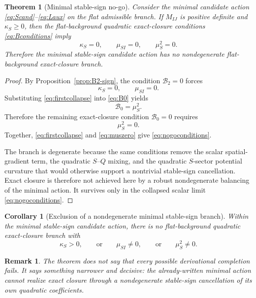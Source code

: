 \documentclass[11pt]{article}
\newtheorem{theorem}{Theorem}
\newtheorem{remark}{Remark}
\newtheorem{corollary}{Corollary}
\begin{document}
\begin{theorem}[Minimal stable-sign no-go]
\label{thm:minimal-no-go}
Consider the minimal candidate action \eqref{eq:Scand}--\eqref{eq:Laux} on the flat admissible branch. If \(\widehat M_{IJ}\) is positive definite and \(\kappa_S\ge 0\), then the flat-background quadratic exact-closure conditions \eqref{eq:Bconditions} imply
\begin{equation}
\kappa_S=0,
\qquad
\mu_{SI}=0,
\qquad
\mu_S^2=0.
\label{eq:nogoconditions}
\end{equation}
Therefore the minimal stable-sign candidate action has no nondegenerate flat-background exact-closure branch.
\end{theorem}

\begin{proof}
By Proposition~\ref{prop:B2-sign}, the condition \(\mathcal B_2=0\) forces
\begin{equation}
\kappa_S=0,
\qquad
\mu_{SI}=0.
\label{eq:firstcollapse}
\end{equation}
Substituting \eqref{eq:firstcollapse} into \eqref{eq:B0} yields
\begin{equation}
\mathcal B_0=\mu_S^2.
\label{eq:B0collapsed}
\end{equation}
Therefore the remaining exact-closure condition \(\mathcal B_0=0\) requires
\begin{equation}
\mu_S^2=0.
\label{eq:muszero}
\end{equation}
Together, \eqref{eq:firstcollapse} and \eqref{eq:muszero} give \eqref{eq:nogoconditions}.

The branch is degenerate because the same conditions remove the scalar spatial-gradient term, the quadratic \(S\)--\(Q\) mixing, and the quadratic \(S\)-sector potential curvature that would otherwise support a nontrivial stable-sign cancellation. Exact closure is therefore not achieved here by a robust nondegenerate balancing of the minimal action. It survives only in the collapsed scalar limit \eqref{eq:nogoconditions}.
\end{proof}

\begin{corollary}[Exclusion of a nondegenerate minimal stable-sign branch]
Within the minimal stable-sign candidate action, there is no flat-background quadratic exact-closure branch with
\[
\kappa_S>0,
\qquad
\text{or}
\qquad
\mu_{SI}\neq 0,
\qquad
\text{or}
\qquad
\mu_S^2\neq 0.
\]
\end{corollary}

\begin{remark}
The theorem does not say that every possible derivational completion fails. It says something narrower and decisive: the already-written minimal action cannot realize exact closure through a nondegenerate stable-sign cancellation of its own quadratic coefficients.
\end{remark}
\end{document}
